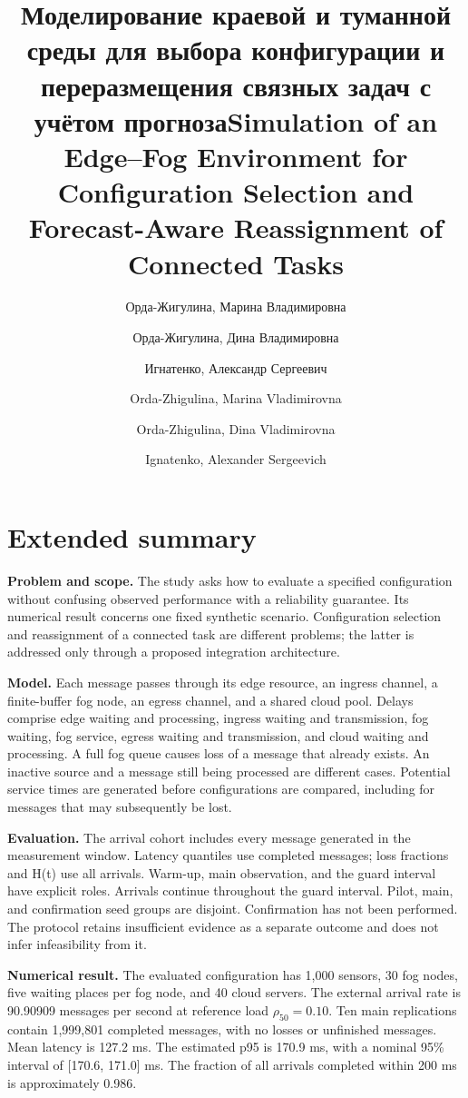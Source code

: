 \documentclass{psta}
\title[Моделирование краевой и туманной среды]{Моделирование краевой и туманной среды для выбора конфигурации и переразмещения связных задач с учётом прогноза}
\author{Орда-Жигулина, Марина Владимировна}
\author{Орда-Жигулина, Дина Владимировна}
\author{Игнатенко, Александр Сергеевич}
\title[Edge--fog simulation and reassignment]{Simulation of an Edge--Fog Environment for Configuration Selection and Forecast-Aware Reassignment of Connected Tasks}
\author{Orda-Zhigulina, Marina Vladimirovna}
\author{Orda-Zhigulina, Dina Vladimirovna}
\author{Ignatenko, Alexander Sergeevich}
\begin{document}
\Russian\maketitle

\raggedbottom
\English\maketitle\section*{Extended summary}
\textbf{Problem and scope.} The study asks how to evaluate a specified configuration without confusing observed performance with a reliability guarantee. Its numerical result concerns one fixed synthetic scenario. Configuration selection and reassignment of a connected task are different problems; the latter is addressed only through a proposed integration architecture.

\textbf{Model.} Each message passes through its edge resource, an ingress channel, a finite-buffer fog node, an egress channel, and a shared cloud pool. Delays comprise edge waiting and processing, ingress waiting and transmission, fog waiting, fog service, egress waiting and transmission, and cloud waiting and processing. A full fog queue causes loss of a message that already exists. An inactive source and a message still being processed are different cases. Potential service times are generated before configurations are compared, including for messages that may subsequently be lost.

\textbf{Evaluation.} The arrival cohort includes every message generated in the measurement window. Latency quantiles use completed messages; loss fractions and H(t) use all arrivals. Warm-up, main observation, and the guard interval have explicit roles. Arrivals continue throughout the guard interval. Pilot, main, and confirmation seed groups are disjoint. Confirmation has not been performed. The protocol retains insufficient evidence as a separate outcome and does not infer infeasibility from it.

\textbf{Numerical result.} The evaluated configuration has 1,000 sensors, 30 fog nodes, five waiting places per fog node, and 40 cloud servers. The external arrival rate is 90.90909 messages per second at reference load \(\rho_{50}=0.10\). Ten main replications contain 1,999,801 completed messages, with no losses or unfinished messages. Mean latency is 127.2 ms. The estimated p95 is 170.9 ms, with a nominal 95\% interval of {[}170.6, 171.0{]} ms. The fraction of all arrivals completed within 200 ms is approximately 0.986.
\end{document}
